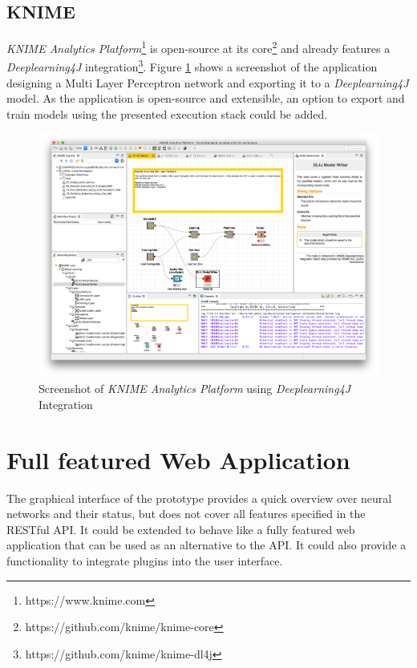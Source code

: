 \subsection{KNIME}\label{knime}

\emph{KNIME Analytics Platform}\footnote{https://www.knime.com} is
open-source at its core\footnote{https://github.com/knime/knime-core}
and already features a \emph{Deeplearning4J} integration\footnote{https://github.com/knime/knime-dl4j}.
Figure \ref{knime} shows a screenshot of the application designing a
Multi Layer Perceptron network and exporting it to a
\emph{Deeplearning4J} model. As the application is open-source and
extensible, an option to export and train models using the presented
execution stack could be added.

\begin{figure}
\centering
\includegraphics[width=17.00000cm]{images/knime}
\caption{Screenshot of \emph{KNIME Analytics Platform} using
\emph{Deeplearning4J} Integration \label{knime}}
\end{figure}

\section{Full featured Web
Application}\label{full-featured-web-application}

The graphical interface of the prototype provides a quick overview over
neural networks and their status, but does not cover all features
specified in the RESTful API. It could be extended to behave like a
fully featured web application that can be used as an alternative to the
API. It could also provide a functionality to integrate plugins into the
user interface.

